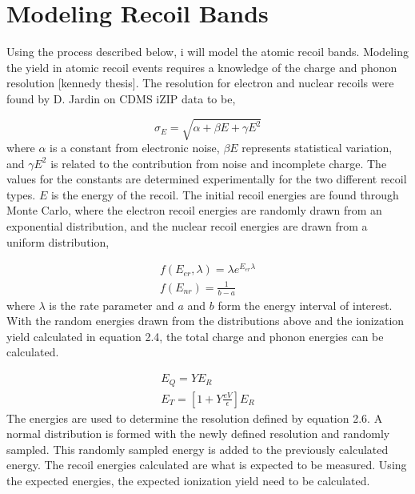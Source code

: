 \section{Modeling Recoil Bands}
Using the process described below, i will model the atomic recoil bands. Modeling the yield in atomic recoil events requires a knowledge of the charge and phonon resolution [kennedy thesis]. The resolution for electron and nuclear recoils were found by D. Jardin on CDMS iZIP data to be,

\begin{equation}
\sigma_E = \sqrt{\alpha +\beta E + \gamma E^2}
\end{equation}
\noindent
where $\alpha$ is a constant from electronic noise, $\beta E$ represents statistical variation, and $\gamma E^2$ is related to the contribution from noise and incomplete charge. The values for the constants are determined experimentally for the two different recoil types. $E$ is the energy of the recoil. The initial recoil energies are found through Monte Carlo, where the electron recoil energies are randomly drawn from an exponential distribution, and the nuclear recoil energies are drawn from a uniform distribution, 

\begin{equation}
\begin{gathered}
f(E_{er},\lambda) = \lambda e^{E_{er}\lambda}\\
f(E_{nr}) = \frac{1}{b-a}
\end{gathered}
\end{equation}
\noindent
where $\lambda$ is the rate parameter and $a$ and $b$ form the energy interval of interest. With the random energies drawn from the distributions above and the ionization yield calculated in equation 2.4, the total charge and phonon energies can be calculated. 

\begin{equation}
\begin{gathered}
E_Q = YE_R\\
E_T = [1 + Y\frac{eV}{\epsilon}]E_R
\end{gathered}
\end{equation} 
The energies are used to determine the resolution defined by equation 2.6. A normal distribution is formed with the newly defined resolution and randomly sampled. This randomly sampled energy is added to the previously calculated energy. The recoil energies calculated are what is expected to be measured. Using the expected energies, the expected ionization yield need to be calculated.

